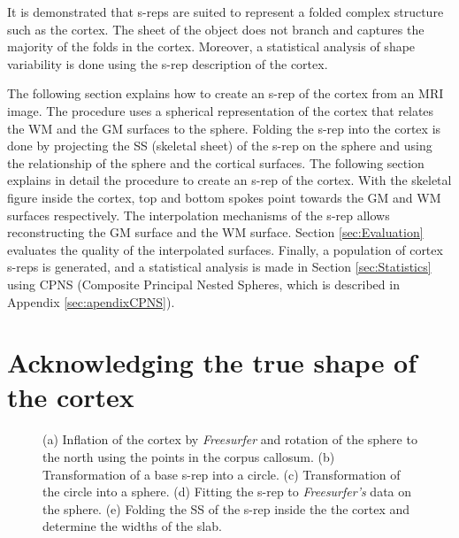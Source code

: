 It is demonstrated that s-reps are suited to represent a folded complex structure such as the cortex.
The sheet of the object does not branch and captures the majority of the folds in the cortex. 
Moreover, a statistical analysis of shape variability is done using the s-rep description of the cortex.

The following section explains how to create an s-rep of the cortex from an MRI image.
The procedure uses a spherical representation of the cortex  \cite{fischl_cortical_1999} 
that relates the WM and the GM surfaces to the sphere.
Folding the s-rep into the cortex is done by 
projecting the SS (skeletal sheet) of the s-rep on the sphere and 
using the relationship of the sphere and the cortical surfaces.
The following section explains in detail the procedure to create an s-rep of the cortex.
With the skeletal figure inside the cortex, 
top and bottom spokes point towards the GM and WM surfaces respectively.
The interpolation mechanisms of the s-rep allows reconstructing the GM surface and the WM surface.
Section \ref{sec:Evaluation} evaluates the quality of the interpolated surfaces.
Finally, a population of cortex s-reps is generated, and a statistical analysis is made in Section \ref{sec:Statistics} using CPNS (Composite Principal Nested Spheres, which is  
described in Appendix \ref{sec:apendixCPNS}).

\section{Acknowledging the true shape of the cortex}
\label{sec:s-repFittingCortex}


\begin{figure*} 
 \centering 
 \caption[Flow diagram of s-rep projection and cortex folding.]{(a) Inflation of the cortex by \textit{Freesurfer} and rotation of the sphere to the north using the points in the corpus callosum. 
          (b) Transformation of a base s-rep into a circle.
          (c) Transformation of the circle into a sphere. 
          (d) Fitting the s-rep to \textit{Freesurfer's} data on the sphere.
          (e) Folding the SS of the s-rep inside the the cortex and determine the widths of the slab. 
          }
 \label{fig:proyProcedure}  
\end{figure*}

